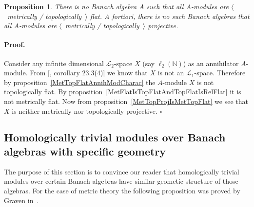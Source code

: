 \documentclass[12pt]{article}
\newtheorem{proposition}[theorem]{Proposition}
\renewenvironment{proof}{\paragraph{Proof.}}{\hfill$\square$\medskip}
\begin{document}
\begin{proposition} There is no Banach algebra $A$ such that all $A$-modules are
    $\langle$~metrically / topologically~$\rangle$ flat. A fortiori, there is no
    such Banach algebras that all $A$-modules are $\langle$~metrically /
    topologically~$\rangle$ projective.
\end{proposition}
\begin{proof} Consider any infinite dimensional $\mathscr{L}_2$-space $X$ (say
    $\ell_2(\mathbb{N})$) as an annihilator $A$-module. From
        [\cite{DefFloTensNorOpId}, corollary 23.3(4)] we know that $X$ is not an
    $\mathscr{L}_1$-space. Therefore by
    proposition~\ref{MetTopFlatAnnihModCharac} the $A$-module $X$ is not
    topologically flat. By proposition~\ref{MetFlatIsTopFlatAndTopFlatIsRelFlat}
    it is not metrically flat. Now from proposition~\ref{MetTopProjIsMetTopFlat}
    we see that $X$ is neither metrically nor topologically projective.
\end{proof}


\subsection{
    Homologically trivial modules over Banach algebras with specific geometry
}\label{
    SubSectionHomologicallyTrivialModulesOverBanachAlgebrasWithSpecificGeometry
}

The purpose of this section is to convince our reader that homologically trivial
modules over certain Banach algebras have similar geometic structure of those
algebras. For the case of metric theory the following proposition was proved by
Graven in~\cite{GravInjProjBanMod}.
\end{document}

